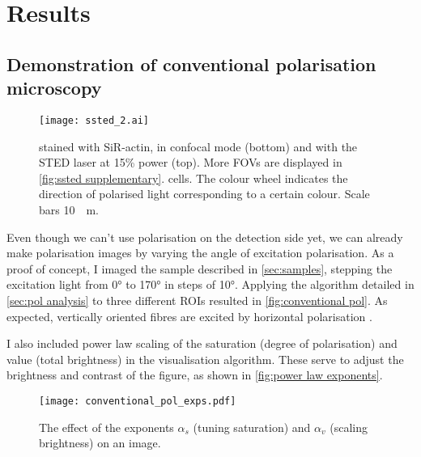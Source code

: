 \chapter{Results}

\section{Demonstration of conventional polarisation microscopy}
\label{sec:conventional pol}

\begin{figure}
	\centering
	\texttt{[image: ssted\_2.ai]}
	\caption{
	 stained with SiR-actin, in confocal mode (bottom) and with the STED laser at 15\% power (top). More FOVs are displayed in \autoref{fig:ssted supplementary}.
	 cells. The colour wheel indicates the direction of polarised light corresponding to a certain colour. Scale bars \SI{10}{\mu m}. 
	}
	\label{fig:conventional pol}
\end{figure}

Even though we can't use polarisation on the detection side yet, we can already make polarisation images by varying the angle of excitation polarisation. As a proof of concept, I imaged the sample described in \autoref{sec:samples}, stepping the excitation light from \ang{0} to \ang{170} in steps of \ang{10}. Applying the algorithm detailed in \autoref{sec:pol analysis} to three different ROIs resulted in \autoref{fig:conventional pol}. As expected, vertically oriented fibres are excited by horizontal polarisation \cite{Spira2017}.

I also included power law scaling of the saturation (degree of polarisation) and value (total brightness) in the visualisation algorithm. These serve to adjust the brightness and contrast of the figure, as shown in \autoref{fig:power law exponents}.

\begin{figure}
	\centering
	\texttt{[image: conventional\_pol\_exps.pdf]}
	\caption{
		The effect of the exponents $ \alpha_s $ (tuning saturation) and $ \alpha_v $ (scaling brightness) on an image.
	}
	\label{fig:power law exponents}
\end{figure}


